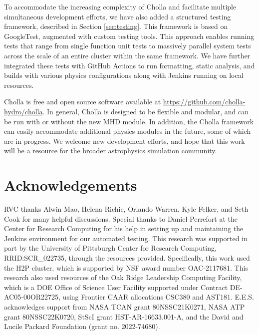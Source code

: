 \documentclass[modern, linenumbers]{aastex631}
\begin{document}
To accommodate the increasing complexity of Cholla and facilitate multiple simultaneous development efforts, we have also added a structured testing framework, described in Section \ref{sec:testing}. This framework is based on GoogleTest, augmented with custom testing tools. This approach enables running tests that range from single function unit tests to massively parallel system tests across the scale of an entire cluster within the same framework. We have further integrated these tests with GitHub Actions to run formatting, static analysis, and builds with various physics configurations along with Jenkins running on local resources.

Cholla is free and open source software available at \url{https://github.com/cholla-hydro/cholla}. In general, Cholla is designed to be flexible and modular, and can be run with or without the new MHD module. In addition, the Cholla framework can easily accommodate additional physics modules in the future, some of which are in progress. We welcome new development efforts, and hope that this work will be a resource for the broader astrophysics simulation community.


\section{Acknowledgements}

RVC thanks Alwin Mao, Helena Richie, Orlando Warren, Kyle Felker, and Seth Cook for many helpful discussions. Special thanks to Daniel Perrefort at the Center for Research Computing for his help in setting up and maintaining the Jenkins environment for our automated testing. This research was supported in part by the University of Pittsburgh Center for Research Computing, RRID:SCR\_022735, through the resources provided. Specifically, this work used the H2P cluster, which is supported by NSF award number OAC-2117681. This research also used resources of the Oak Ridge Leadership Computing Facility, which is a DOE Office of Science User Facility supported under Contract DE-AC05-00OR22725, using Frontier CAAR allocations CSC380 and AST181. E.E.S. acknowledges support from NASA TCAN grant 80NSSC21K0271, NASA ATP grant 80NSSC22K0720, StScI grant HST-AR-16633.001-A, and the David and Lucile Packard Foundation (grant no. 2022-74680).



\end{document}
